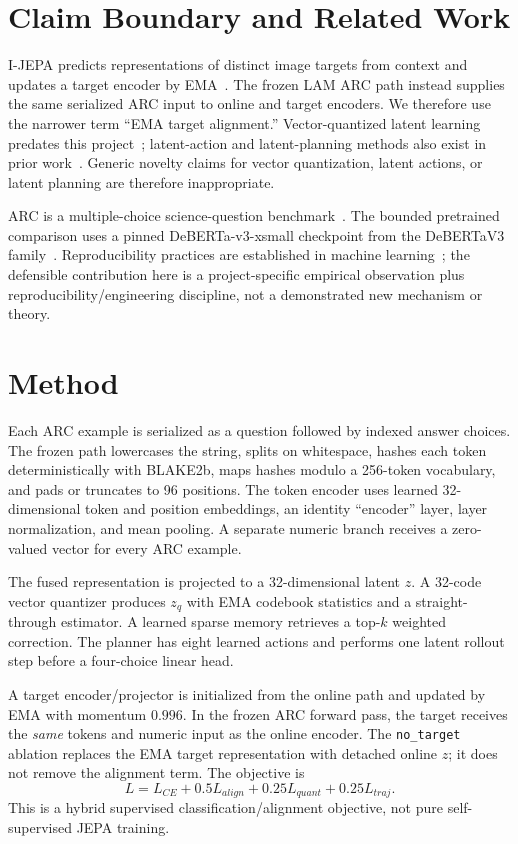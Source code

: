 \documentclass[conference]{IEEEtran}
\begin{document}
\section{Claim Boundary and Related Work}
I-JEPA predicts representations of distinct image targets from context and updates a target encoder by EMA~\cite{ijepa}. The frozen LAM ARC path instead supplies the same serialized ARC input to online and target encoders. We therefore use the narrower term ``EMA target alignment.'' Vector-quantized latent learning predates this project~\cite{vqvae}; latent-action and latent-planning methods also exist in prior work~\cite{lapa,ffjepa}. Generic novelty claims for vector quantization, latent actions, or latent planning are therefore inappropriate.

ARC is a multiple-choice science-question benchmark~\cite{arc}. The bounded pretrained comparison uses a pinned DeBERTa-v3-xsmall checkpoint from the DeBERTaV3 family~\cite{deberta}. Reproducibility practices are established in machine learning~\cite{repro}; the defensible contribution here is a project-specific empirical observation plus reproducibility/engineering discipline, not a demonstrated new mechanism or theory.

\section{Method}
Each ARC example is serialized as a question followed by indexed answer choices. The frozen path lowercases the string, splits on whitespace, hashes each token deterministically with BLAKE2b, maps hashes modulo a 256-token vocabulary, and pads or truncates to 96 positions. The token encoder uses learned 32-dimensional token and position embeddings, an identity ``encoder'' layer, layer normalization, and mean pooling. A separate numeric branch receives a zero-valued vector for every ARC example.

The fused representation is projected to a 32-dimensional latent $z$. A 32-code vector quantizer produces $z_q$ with EMA codebook statistics and a straight-through estimator. A learned sparse memory retrieves a top-$k$ weighted correction. The planner has eight learned actions and performs one latent rollout step before a four-choice linear head.

A target encoder/projector is initialized from the online path and updated by EMA with momentum $0.996$. In the frozen ARC forward pass, the target receives the \emph{same} tokens and numeric input as the online encoder. The \texttt{no\_target} ablation replaces the EMA target representation with detached online $z$; it does not remove the alignment term. The objective is
\begin{equation}
L=L_{CE}+0.5L_{align}+0.25L_{quant}+0.25L_{traj}.
\end{equation}
This is a hybrid supervised classification/alignment objective, not pure self-supervised JEPA training.
\end{document}
